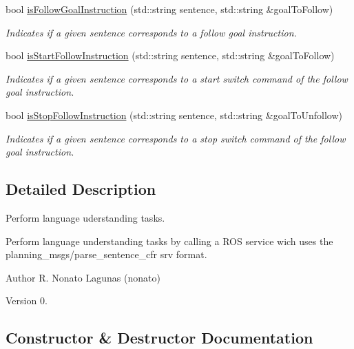 \begin{DoxyCompactItemize}
bool \hyperlink{class_lang_understanding_tasks_a54c9a8ad3bd20938bce720b86711198f}{is\+Follow\+Goal\+Instruction} (std\+::string sentence, std\+::string \&goal\+To\+Follow)
\begin{DoxyCompactList}\small\item\em Indicates if a given sentence corresponds to a follow goal instruction. \end{DoxyCompactList}\item 
bool \hyperlink{class_lang_understanding_tasks_a095f138989fbc7d139272a82490c3361}{is\+Start\+Follow\+Instruction} (std\+::string sentence, std\+::string \&goal\+To\+Follow)
\begin{DoxyCompactList}\small\item\em Indicates if a given sentence corresponds to a start switch command of the follow goal instruction. \end{DoxyCompactList}\item 
bool \hyperlink{class_lang_understanding_tasks_acab2b17e01d5eb7b89440659abeb62ad}{is\+Stop\+Follow\+Instruction} (std\+::string sentence, std\+::string \&goal\+To\+Unfollow)
\begin{DoxyCompactList}\small\item\em Indicates if a given sentence corresponds to a stop switch command of the follow goal instruction. \end{DoxyCompactList}\end{DoxyCompactItemize}


\subsection{Detailed Description}
Perform language uderstanding tasks. 

Perform language understanding tasks by calling a R\+OS service wich uses the planning\+\_\+msgs/parse\+\_\+sentence\+\_\+cfr srv format.

\begin{DoxyAuthor}{Author}
R. Nonato Lagunas (nonato) 
\end{DoxyAuthor}
\begin{DoxyVersion}{Version}
0. 
\end{DoxyVersion}


\subsection{Constructor \& Destructor Documentation}
